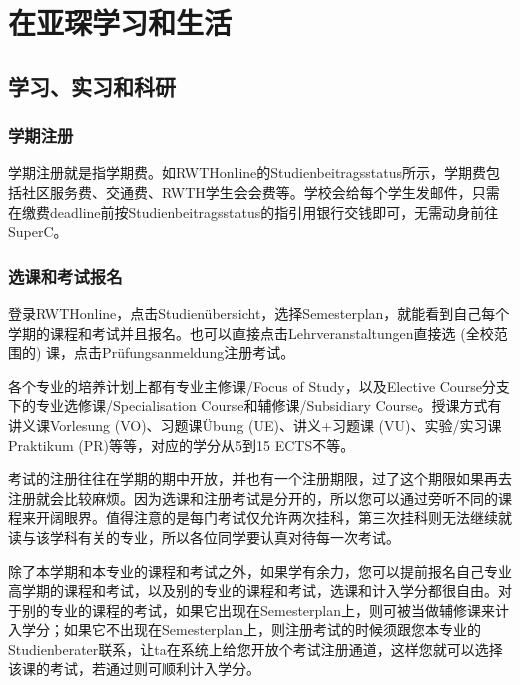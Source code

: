 
\chapter{在亚琛学习和生活}\label{chap:在亚琛学习和生活}

\section{学习、实习和科研}\label{sec:学习、实习和科研}

  \subsection{学期注册}\label{subsec:学期注册}

    学期注册就是指学期费。如RWTHonline的Studienbeitragsstatus所示，学期费包括社区服务费、交通费、RWTH学生会会费等。学校会给每个学生发邮件，只需在缴费deadline前按Studienbeitragsstatus的指引用银行交钱即可，无需动身前往SuperC。

  \subsection{选课和考试报名}\label{subsec:选课和考试报名}

    登录RWTHonline，点击Studienübersicht，选择Semesterplan，就能看到自己每个学期的课程和考试并且报名。也可以直接点击Lehrveranstaltungen直接选 (全校范围的) 课，点击Prüfungsanmeldung注册考试。

    各个专业的培养计划上都有专业主修课/Focus of Study，以及Elective Course分支下的专业选修课/Specialisation Course和辅修课/Subsidiary Course。授课方式有讲义课Vorlesung (VO)、习题课Übung (UE)、讲义+习题课 (VU)、实验/实习课Praktikum (PR)等等，对应的学分从5到15 ECTS不等。

    考试的注册往往在学期的期中开放，并也有一个注册期限，过了这个期限如果再去注册就会比较麻烦。因为选课和注册考试是分开的，所以您可以通过旁听不同的课程来开阔眼界。值得注意的是每门考试仅允许两次挂科，第三次挂科则无法继续就读与该学科有关的专业，所以各位同学要认真对待每一次考试。

    除了本学期和本专业的课程和考试之外，如果学有余力，您可以提前报名自己专业高学期的课程和考试，以及别的专业的课程和考试，选课和计入学分都很自由。对于别的专业的课程的考试，如果它出现在Semesterplan上，则可被当做辅修课来计入学分；如果它不出现在Semesterplan上，则注册考试的时候须跟您本专业的Studienberater联系，让ta在系统上给您开放个考试注册通道，这样您就可以选择该课的考试，若通过则可顺利计入学分。

